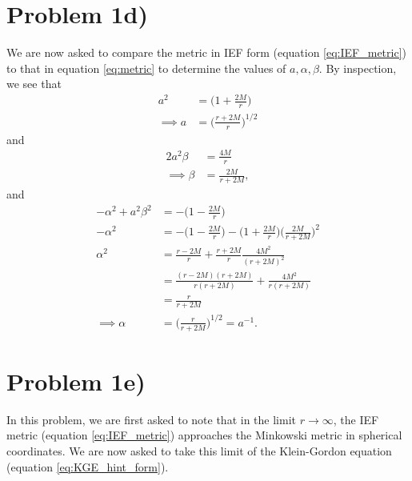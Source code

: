 \documentclass[12pt]{article}
\numberwithin{equation}{section}
\begin{document}
\section{Problem 1d)}
We are now asked to compare the metric in IEF form (equation \ref{eq:IEF_metric}) to that in equation \ref{eq:metric} to determine the values of $a, \alpha, \beta$.  By inspection, we see that
\begin{equation}
\begin{aligned}
a^2 &= \Big(1 + \frac{2 M}{r} \Big) \\
\implies a &= \Big( \frac{r + 2 M}{r} \Big)^{1/2}
\end{aligned}
\end{equation}
and
\begin{equation}
\begin{aligned}
2 a^2 \beta &= \frac{4 M}{r} \\
\implies \beta &= \frac{2 M}{r + 2 M},
\end{aligned}
\end{equation}
and
\begin{equation}
\begin{aligned}
-\alpha^2 + a^2 \beta^2 &= - \Big( 1 - \frac{2 M}{r} \Big) \\
-\alpha^2 &= - \Big( 1 - \frac{2 M}{r} \Big) - \Big(1 + \frac{2 M}{r} \Big) \Big( \frac{2 M}{r + 2 M} \Big)^2 \\
\alpha^2 &= \frac{r - 2 M}{r} + \frac{r + 2 M}{r} \frac{4 M^2}{(r + 2 M)^2} \\
&= \frac{(r - 2 M) (r + 2 M)}{r (r + 2M)} + \frac{4 M^2}{r (r + 2 M)} \\
&= \frac{r}{r + 2M} \\
\implies \alpha &= \Big( \frac{r}{r + 2 M} \Big)^{1/2} = a^{-1}.
\end{aligned}
\end{equation}

\section{Problem 1e)}
In this problem, we are first asked to note that in the limit $r \to \infty$, the IEF metric (equation \ref{eq:IEF_metric}) approaches the Minkowski metric in spherical coordinates.  We are now asked to take this limit of the Klein-Gordon equation (equation \ref{eq:KGE_hint_form}).
\end{document}
